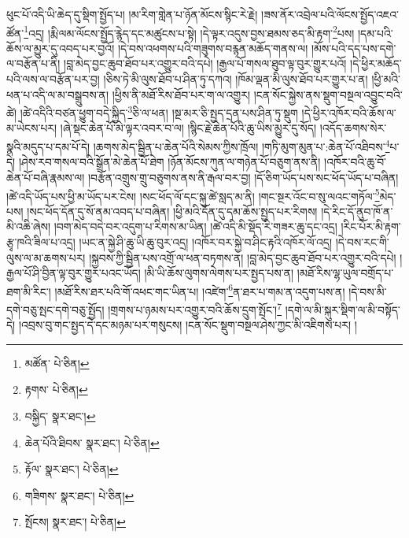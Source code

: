 ཕུང་པོ་འདི་ཡི་ཆེད་དུ་སྡིག་སྤྱོད་པ། །མ་རིག་གླེན་པ་ཉོན་མོངས་སྙིང་རེ་རྗེ། །ཟས་ནོར་འབྲེལ་པའི་ལོངས་སྤྱོད་འཇའ་ཚོན་\footnote{མཚོན་  པེ་ཅིན། }འདྲ། །རྨི་ལམ་ལོངས་སྤྱོད་རྙེད་དང་མཚུངས་པ་སྟེ། །དེ་ལྟར་འདུས་བྱས་ཐམས་ཅད་མི་རྟག་\footnote{རྟགས་  པེ་ཅིན། }པས། །དམ་པའི་ཆོས་ལ་མྱུར་དུ་འབད་པར་བྱའོ། །དེ་བས་འཕགས་པའི་གཟུགས་བརྙན་མཆོད་གནས་ལ། །མོས་པའི་དད་པས་དགེ་ལ་བརྩོན་པ་ནི། །བླ་མེད་བྱང་ཆུབ་ཐོབ་པར་འགྱུར་བའི་དཔེ། །རྒྱལ་པོ་གསལ་ཐུབ་ལྟ་བུར་གྱུར་པའོ། །དེ་ཕྱིར་མཆོད་པའི་ལས་ལ་བརྩོན་པར་བྱ། །ཅིས་ཏེ་མི་ལུས་ཐོབ་པ་ཤིན་ཏུ་དཀའ། །ཁོམ་ལྡན་མི་ལུས་ཐོབ་པར་གྱུར་པ་ན། །ཕྱི་མའི་ཕན་པ་འདི་ལ་མ་བསྒྲུབས་ན། །ཕྱིས་ནི་མཐོ་རིས་ཐོབ་པར་ག་ལ་འགྱུར། །ངན་སོང་སྐྱེས་ནས་སྡུག་བསྔལ་འབྱུང་བའི་ཚེ། །ཚེ་འདིའི་བཙན་ཕྱུག་བདེ་སྐྱིད་\footnote{བསྐྱིད་  སྣར་ཐང་། }ཅི་ལ་ཕན། །སྔ་མར་ཅི་སྤྱད་དྲན་པས་ཤིན་ཏུ་སྡུག །དེ་ཕྱིར་འཁོར་བའི་ཆོས་ལ་མ་ཡེངས་པར། །ཞེ་སྡང་ཆེན་པོ་མེ་ལྟར་འབར་བ་ལ། །སྙིང་རྗེ་ཆེན་པོའི་ཆུ་ཡིས་མྱུར་དུ་སོད། །འདོད་ཆགས་སེར་སྣའི་མདུད་པ་དམ་པོ་དེ། །ཆགས་མེད་སྦྱིན་པ་ཆེན་པོའི་སེམས་ཀྱིས་ཁྲོལ། །གཏི་མུག་མུན་པ་:ཆེན་པོ་འཐིབས་\footnote{ཆེན་པོའི་ཐིབས་  སྣར་ཐང་།  པེ་ཅིན། }པ་དེ། །ཤེས་རབ་གསལ་བའི་སྒྲོན་མེ་ཆེན་པོ་ཐེག །ཉོན་མོངས་ཀུན་ལ་གཉེན་པོ་བཅུག་ནས་ནི། །འཁོར་བའི་ཆུ་བོ་ཆེན་པོ་བཞི་རྣམས་ལ། །བརྩོན་འགྲུས་གྲུ་བཅུགས་ནས་ནི་རྒལ་བར་བྱ། །དོ་ཅིག་ཡོད་པས་སང་ཕོད་ཡོད་པ་བཞིན། །ཚེ་འདི་ཡོད་པས་ཕྱི་མ་ཡོད་པར་ངེས། །སང་ཕོད་ལོ་དང་སྐུ་ཚེ་སླད་མ་ནི། །གང་སྔར་འོང་བ་སུ་ལའང་གཏོལ་\footnote{རྟོལ་  སྣར་ཐང་།  པེ་ཅིན། }མེད་པས། །སང་ཕོད་དོན་དུ་སོ་ནམ་འབད་པ་བཞིན། །ཕྱི་མའི་དོན་དུ་དམ་ཆོས་སྤྱད་པར་རིགས། །དེ་རིང་དོ་ནུབ་ཁོ་ན་མི་འཆི་ཞེས། །བག་མེད་བདེ་བར་འདུག་པ་རིགས་མ་ཡིན། །ཚེ་འདི་མི་སྡོད་རི་གཟར་ཆུ་དང་འདྲ། །རིང་པོར་མི་རྟག་རྩྭ་ཁའི་ཟིལ་པ་འདྲ། །ཡང་ན་སྐྱེ་ཤི་ཆུ་ཡི་ཆུ་བུར་འདྲ། །འཁོར་བར་སྐྱེ་བ་ཤིང་རྟའི་འཁོར་ལོ་འདྲ། །དེ་བས་རང་གི་ལུས་ལ་མ་ཆགས་པར། །སྐྱབས་ཀྱི་སྦྱིན་པས་འགྲོ་ལ་ཕན་བཏགས་ན། །བླ་མེད་བྱང་ཆུབ་ཐོབ་པར་འགྱུར་བའི་དཔེ། །རྒྱལ་པོ་ཤི་བྱིན་ལྟ་བུར་གྱུར་པའང་ཡོད། །མི་ཡི་ཆོས་ལུགས་ལེགས་པར་སྤྱད་པས་ན། །མཐོ་རིས་ལྷ་ཡུལ་བགྲོད་པ་ཐག་མི་རིང་། །མཐོ་རིས་ཐར་པའི་གོ་འཕང་གང་ཡིན་པ། །འཛེག་\footnote{གཟིགས་  སྣར་ཐང་།  པེ་ཅིན། }ན་ཐར་པ་གམ་ན་འདུག་པས་ན། །དེ་བས་མི་དགེ་བཅུ་སྤང་དགེ་བཅུ་སྤྱོད། །གྲགས་པ་ཉམས་པར་འགྱུར་བའི་ཆོས་དྲུག་སྤོང་།\footnote{སྤོངས།  སྣར་ཐང་།  པེ་ཅིན། } །དགེ་ལ་མི་སྐུར་སྡིག་ལ་མི་བསྟོད་དེ། །འབྲས་བུ་གང་སྤྱད་དེ་དང་མཉམ་པར་གསུངས། །ངན་སོང་སྡུག་བསྔལ་ཤེས་ཀྱང་མི་འཇིགས་པར། །
